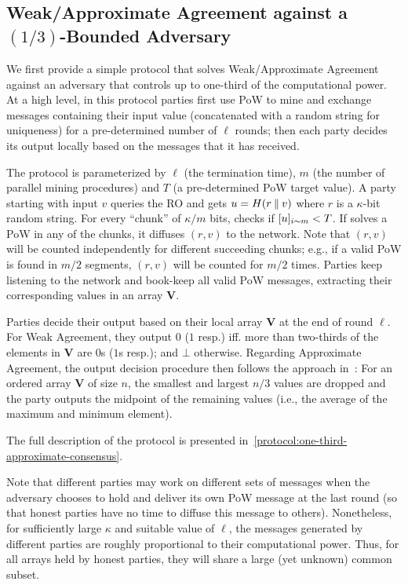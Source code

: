 \subsection{Weak/Approximate Agreement against a $(1/3)$-Bounded Adversary}
\label{subsec:apa-one-third}

We first provide a simple protocol that solves Weak/Approximate Agreement against an adversary that controls up to one-third of the computational power.
%
At a high level, in this protocol parties first use \mforone PoW to mine and exchange messages containing their input value (concatenated with a random string for uniqueness) for a pre-determined number of $\ell$ rounds; then each party \party decides its output locally based on the messages that it has received.

The protocol is parameterized by $\ell$ (the termination time), $m$ (the number of parallel mining procedures) and $T$ (a pre-determined PoW target value).
%
A party \party starting with input $v$ queries the RO and gets $u = H(r \mathbin\Vert v)$ where $r$ is a $\kappa$-bit random string.
%
For every ``chunk''  of $\kappa / m$ bits, \party checks if $[u]_{i\sim m} < T$.
%
If \party solves a PoW in any of the chunks, it diffuses $(r, v)$ to the network.
%
Note that $(r, v)$ will be counted independently for different succeeding chunks; e.g., if a valid PoW is found in $m / 2$ segments, $(r, v)$ will be counted for $m / 2$ times.
%
Parties keep listening to the network and book-keep all valid PoW messages, extracting their corresponding values in an array \textbf{V}.

Parties decide their output based on their local array \textbf{V} at the end of round $\ell$.
%
For Weak Agreement, they output $0$ ($1$ resp.) iff. more than two-thirds of the elements in \textbf{V} are $0$s ($1$s resp.); and $\bot$ otherwise.
%
Regarding Approximate Agreement, the output decision procedure then follows the approach in~\cite{JACM:DLPSW86}:
%
For an ordered array \textbf{V} of size $n$, the smallest and largest $n / 3$ values are dropped and the party outputs the midpoint of the remaining values (i.e., the average of the maximum and minimum element).

The full description of the protocol is presented in~\cref{protocol:one-third-approximate-consensus}.



Note that different parties may work on different sets of messages when the adversary chooses to hold and deliver its own PoW message at the last round (so that honest parties have no time to diffuse this message to others).
%
Nonetheless, for sufficiently large $\kappa$ and suitable value of $\ell$, the messages generated by different parties are roughly proportional to their computational power.
%
Thus, for all arrays held by honest parties, they will share a large (yet unknown) common subset.


